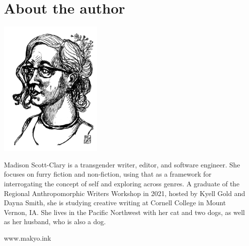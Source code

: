 \chapter*{About the author}

\begin{center}
  \includegraphics[width=2in]{content/headshot.png}
\end{center}

\noindent Madison Scott-Clary is a transgender writer, editor, and software engineer. She focuses on furry fiction and non-fiction, using that as a framework for interrogating the concept of self and exploring across genres. A graduate of the Regional Anthropomorphic Writers Workshop in 2021, hosted by Kyell Gold and Dayna Smith, she is studying creative writing at Cornell College in Mount Vernon, IA. She lives in the Pacific Northwest with her cat and two dogs, as well as her husband, who is also a dog.

\begin{center}
    www.makyo.ink
\end{center}

\vfill
